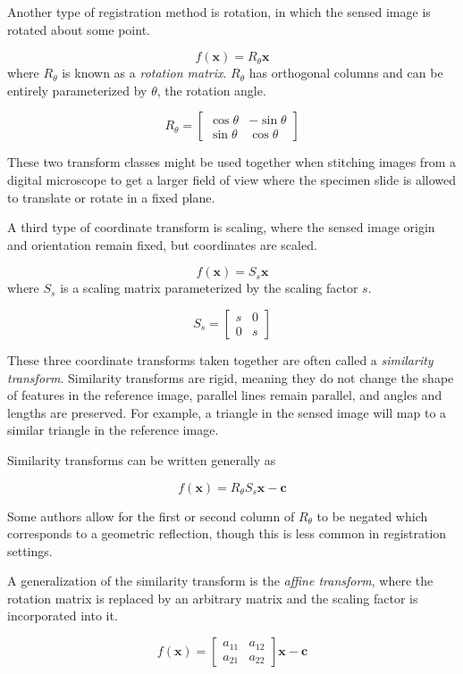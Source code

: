 \documentclass[tocnosub,noragright,centerchapter,12pt]{uiucecethesis09}
\begin{document}
Another type of registration method is rotation, in which the sensed image is rotated about some point.

$$f(\bm{x}) = R_{\theta}\bm{x}$$
where $R_{\theta}$ is known as a \emph{rotation matrix}.  $R_{\theta}$ has orthogonal columns and can be entirely parameterized by $\theta$, the rotation angle.

$$
R_{\theta} = \begin{bmatrix} \cos \theta & - \sin \theta \\ \sin \theta & \cos \theta \end{bmatrix}
$$

These two transform classes might be used together when stitching images from a digital microscope to get a larger field of view where the specimen slide is allowed to translate or rotate in a fixed plane.

A third type of coordinate transform is scaling, where the sensed image origin and orientation remain fixed, but coordinates are scaled.

$$f(\bm{x}) = S_s \bm{x}$$
where $S_s$ is a scaling matrix parameterized by the scaling factor $s$.

$$S_s = \begin{bmatrix} s & 0 \\ 0 & s \end{bmatrix}$$

These three coordinate transforms taken together are often called a \emph{similarity transform}.  Similarity transforms are rigid, meaning they do not change the shape of features in the reference image, parallel lines remain parallel, and angles and lengths are preserved.  For example, a triangle in the sensed image will map to a similar triangle in the reference image.

Similarity transforms can be written generally as

$$f(\bm{x}) = R_{\theta} S_s \bm{x} - \bm{c}$$

Some authors allow for the first or second column of $R_{\theta}$ to be negated which corresponds to a geometric reflection, though this is less common in registration settings.

A generalization of the similarity transform is the \emph{affine transform}, where the rotation matrix is replaced by an arbitrary matrix and the scaling factor is incorporated into it.

$$f(\bm{x}) = \begin{bmatrix} a_{11} & a_{12} \\ a_{21} & a_{22} \end{bmatrix} \bm{x} - \bm{c}$$
\end{document}
